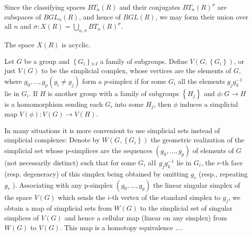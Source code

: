 Since the classifying spaces $B T_n(R)$ and their conjugates $B T_n(R)^\sigma$ are subspaces of $B G L_n(R)$, and hence of $B G L(R)$, we may form their union over all $n$ and $\sigma: X(R)=\bigcup_{n, \sigma} B T_n(R)^\sigma$. 


\begin{theo}
    The space $X(R)$ is acyclic. 
\end{theo}









Let $G$ be a group and $\left\{G_i\right\}{ }_{i \varepsilon I}$ a family of subgroups. Define $V\left(G,\left\{G_i\right\}\right)$, or just $V(G)$ to be the simplicial complex, whose vertices are the elements of $G$, where $g_0, \ldots, g_p\left(g_i \neq g_j\right)$ form a $p$-simplex if for some $G_i$ all the elements $g_j g_k^{-1}$ lie in $G_i$. If $H$ is another group with a family of subgroups $\left\{H_j\right\}$ and $\phi: G \rightarrow H$ is a homomorphism sending each $G_i$ into some $H_j$, then $\phi$ induces a simplicial map $V(\phi): V(G) \rightarrow V(H)$.

In many situations it is more convenient to use simplicial sets instead of simplicial complexes: Denote by $W\left(G,\left\{G_i\right\}\right)$ the geometric realization of the simplicial set whose p-simplices are the sequences $\left(g_0, \ldots, g_p\right)$ of elements of $G$ (not necessarily distinct) such that for some $G_i$ al1 $g_j g_k^{-1}$ lie in $G_i$, the $r$-th face (resp. degeneracy) of this simplex being obtained by omitting $g_r$ (resp., repeating $g_r$ ). Associating with any p-simplex $\left(g_0, \ldots, g_p\right)$ the linear singular simplex of the space $V(G)$ which sends the $i$-th vertex of the standard simplex to $g_j$, we obtain a map of simplicial sets from $W(G)$ to the simplicial set of singular simplices of $V(G)$ and hence a cellular map (linear on any simplex) from $W(G)$ to $V(G)$. This map is a homotopy equivalence .... %

